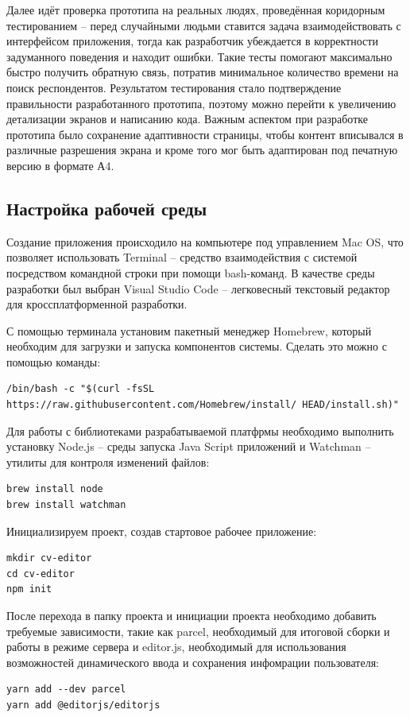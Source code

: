 \documentclass[master, och, diploma]{SCWorks}
\begin{document}
Далее идёт проверка прототипа на реальных людях, проведённая коридорным тестированием – перед случайными людьми ставится задача взаимодействовать с интерфейсом приложения, тогда как разработчик убеждается в корректности задуманного поведения и находит ошибки. Такие тесты помогают максимально быстро получить обратную связь, потратив минимальное количество времени на поиск респондентов. Результатом тестирования стало подтверждение правильности разработанного прототипа, поэтому можно перейти к увеличению детализации экранов и написанию кода. Важным аспектом при разработке прототипа было сохранение адаптивности страницы, чтобы контент вписывался в различные разрешения экрана и кроме того мог быть адаптирован под печатную версию в формате А4.



\subsection{Настройка рабочей среды}
Создание приложения происходило на компьютере под управлением Mac OS, что позволяет использовать Terminal – средство взаимодействия с системой посредством командной строки при помощи bash-команд. В качестве среды разработки был выбран Visual Studio Code – легковесный текстовый редактор для кроссплатформенной разработки.

С помощью терминала установим пакетный менеджер Homebrew, который необходим для загрузки и запуска компонентов системы. Сделать это можно с помощью команды:
\begin{verbatim}
/bin/bash -c "$(curl -fsSL https://raw.githubusercontent.com/Homebrew/install/ HEAD/install.sh)"
\end{verbatim}

Для работы с библиотеками разрабатываемой платфрмы необходимо выполнить установку Node.js – среды запуска Java Script приложений и Watchman – утилиты для контроля изменений файлов:
\begin{verbatim}
brew install node
brew install watchman
\end{verbatim}

Инициализируем проект, создав стартовое рабочее приложение:
\begin{verbatim}
mkdir cv-editor
cd cv-editor
npm init
\end{verbatim}

После перехода в папку проекта и инициации проекта необходимо добавить требуемые зависимости, такие как parcel, необходимый для итоговой сборки и работы в режиме сервера и editor.js, необходимый для использования возможностей динамического ввода и сохранения инфомрации пользователя:
\begin{verbatim}
yarn add --dev parcel
yarn add @editorjs/editorjs
\end{verbatim}
\end{document}
